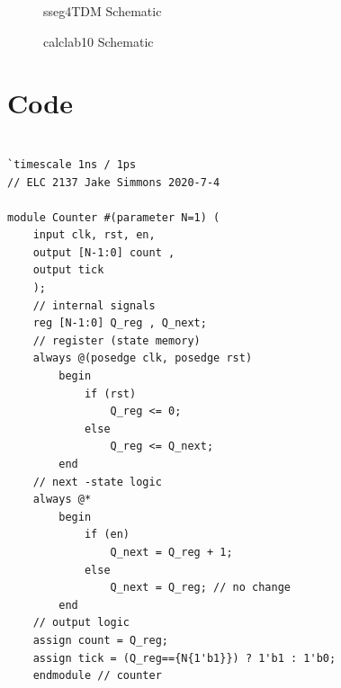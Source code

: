 \documentclass[11pt]{article}
\begin{document}
\begin{figure}[ht]\centering
	\caption{sseg4TDM Schematic}
	\label{fig:picture}
\end{figure}

\begin{figure}[ht]\centering
	\caption{calclab10 Schematic}
	\label{fig:picture}
\end{figure}

\clearpage
\section*{Code}

\begin{lstlisting}[style=Verilog,
caption=Counter Module,
label=counter 
]

`timescale 1ns / 1ps
// ELC 2137 Jake Simmons 2020-7-4

module Counter #(parameter N=1) ( 
	input clk, rst, en, 
	output [N-1:0] count , 
	output tick 
	);
	// internal signals 
	reg [N-1:0] Q_reg , Q_next;
	// register (state memory) 
	always @(posedge clk, posedge rst) 
		begin 
			if (rst) 
				Q_reg <= 0; 
			else 
				Q_reg <= Q_next; 
		end
	// next -state logic 
	always @* 
		begin 
			if (en) 
				Q_next = Q_reg + 1; 
			else 
				Q_next = Q_reg; // no change 
		end
	// output logic 
	assign count = Q_reg; 
	assign tick = (Q_reg=={N{1'b1}}) ? 1'b1 : 1'b0;
	endmodule // counter
\end{lstlisting}
\end{document}
